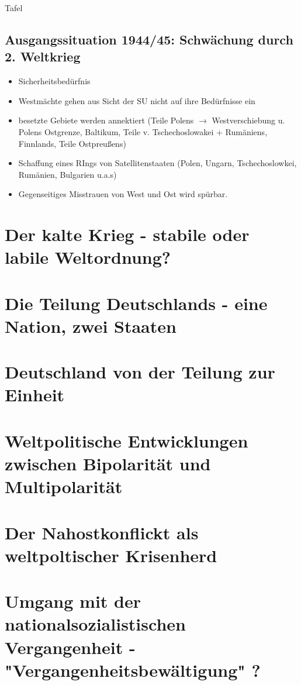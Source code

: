 \documentclass[11pt,a4paper,oneside]{article}
\begin{document}
	
	\newpage
	
	\begin{histloesung}{Tafel}
		\subsection*{Ausgangssituation 1944/45: Schwächung durch 2. Weltkrieg}
		\begin{itemize}
			\item Sicherheitsbedürfnis
			\item Westmächte gehen aus Sicht der SU nicht auf ihre Bedürfnisse ein
			\item besetzte Gebiete werden annektiert (Teile Polens $\rightarrow$ Westverschiebung u. Polens Ostgrenze, Baltikum, Teile v. Tschechoslowakei + Rumäniens, Finnlands, Teile Ostpreußens)
			\item Schaffung eines RIngs von Satellitenstaaten (Polen, Ungarn, Tschechoslowkei, Rumänien, Bulgarien u.a.s)
			\item Gegenseitiges Misstrauen von West und Ost wird spürbar.
		\end{itemize}
	\end{histloesung}
	
	
	
	\newpage
	
	
	\section{Der kalte Krieg - stabile oder labile Weltordnung?}
	\section{Die Teilung Deutschlands - eine Nation, zwei Staaten}
	\section{Deutschland von der Teilung zur Einheit}
	\section{Weltpolitische Entwicklungen zwischen Bipolarität und Multipolarität}
	\section{Der Nahostkonflickt als weltpoltischer Krisenherd}
	\section{Umgang mit der nationalsozialistischen Vergangenheit - "Vergangenheitsbewältigung" ?}
	
\end{document}
